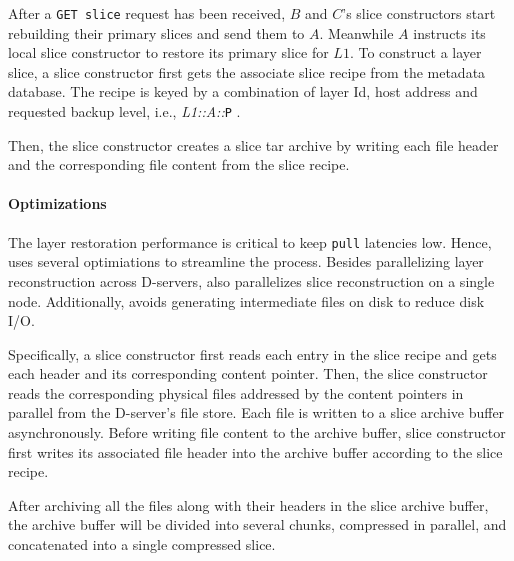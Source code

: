 After a \texttt{GET slice} request has been received, 
$B$ and $C$'s slice constructors start rebuilding their primary slices and send them to $A$.
Meanwhile $A$ instructs its local slice constructor to restore its primary slice for $L1$.
%
To construct a layer slice, a slice constructor first gets the associate slice recipe
from the metadata database. The recipe is keyed by a combination of layer Id, host address and requested
backup level, i.e., \emph{L1::A::}\texttt{P} .

Then, the slice constructor creates a slice tar archive by writing each file header and the corresponding
file content from the slice recipe.

\paragraph{Optimizations}
The layer restoration performance is critical to keep \texttt{pull} latencies low. Hence,
\sysname uses several optimiations to streamline the process.
%
Besides parallelizing layer reconstruction across D-servers, \sysname also
parallelizes slice reconstruction on a single node.
%
Additionally, \sysname avoids generating intermediate files on disk to reduce disk I/O.
%
%

Specifically, a slice constructor first reads each entry in the slice recipe
and gets each header and its corresponding content pointer.
%
Then, the slice constructor reads the corresponding physical files addressed by the content
pointers in parallel from the D-server's file store.
%
Each file is written to a slice archive buffer asynchronously.
Before writing file content to the archive buffer, slice constructor first writes its
associated file header into the archive buffer according to the slice recipe.

After archiving all the files along with their headers in the slice archive buffer,
the archive buffer will be divided into several chunks, compressed in parallel,
and concatenated into a single compressed slice.
%
%

